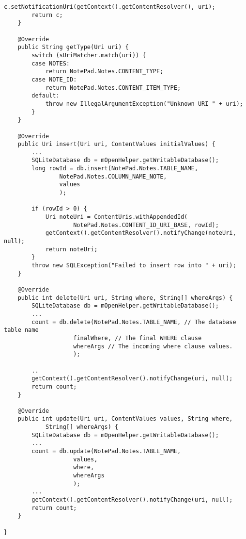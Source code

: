 \begin{lstlisting}[frame=single, caption=ContentProvider 예, label=src:provider]
		c.setNotificationUri(getContext().getContentResolver(), uri);
		return c;
	}

	@Override
	public String getType(Uri uri) {
		switch (sUriMatcher.match(uri)) {
		case NOTES:
			return NotePad.Notes.CONTENT_TYPE;
		case NOTE_ID:
			return NotePad.Notes.CONTENT_ITEM_TYPE;
		default:
			throw new IllegalArgumentException("Unknown URI " + uri);
		}
	}

	@Override
	public Uri insert(Uri uri, ContentValues initialValues) {
		...
		SQLiteDatabase db = mOpenHelper.getWritableDatabase();
		long rowId = db.insert(NotePad.Notes.TABLE_NAME,
				NotePad.Notes.COLUMN_NAME_NOTE, 
				values 
				);

		if (rowId > 0) {
			Uri noteUri = ContentUris.withAppendedId(
					NotePad.Notes.CONTENT_ID_URI_BASE, rowId);
			getContext().getContentResolver().notifyChange(noteUri, null);
			return noteUri;
		}
		throw new SQLException("Failed to insert row into " + uri);
	}

	@Override
	public int delete(Uri uri, String where, String[] whereArgs) {
		SQLiteDatabase db = mOpenHelper.getWritableDatabase();
		...
		count = db.delete(NotePad.Notes.TABLE_NAME, // The database table name
					finalWhere, // The final WHERE clause
					whereArgs // The incoming where clause values.
					);

		..
		getContext().getContentResolver().notifyChange(uri, null);
		return count;
	}

	@Override
	public int update(Uri uri, ContentValues values, String where,
			String[] whereArgs) {
		SQLiteDatabase db = mOpenHelper.getWritableDatabase();
		...
		count = db.update(NotePad.Notes.TABLE_NAME, 
					values, 
					where, 
					whereArgs 
					);
		...
		getContext().getContentResolver().notifyChange(uri, null);
		return count;
	}

}
\end{lstlisting}
